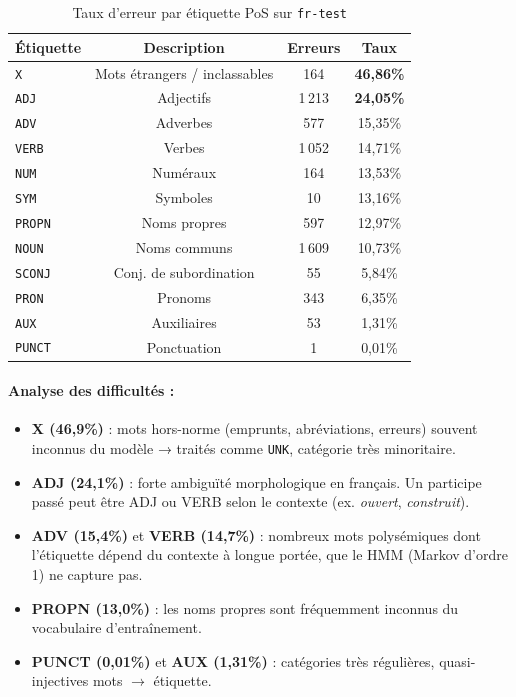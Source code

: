 \documentclass[12pt,a4paper]{article}
\begin{document}
\begin{table}[H]
\centering
\caption{Taux d'erreur par étiquette PoS sur \texttt{fr-test}}
\begin{tabular}{lccc}
\toprule
\textbf{Étiquette} & \textbf{Description} & \textbf{Erreurs} & \textbf{Taux} \\
\midrule
\texttt{X}     & Mots étrangers / inclassables & 164   & \textbf{46,86\%} \\
\texttt{ADJ}   & Adjectifs                     & 1\,213 & \textbf{24,05\%} \\
\texttt{ADV}   & Adverbes                      &   577  & 15,35\% \\
\texttt{VERB}  & Verbes                        & 1\,052 & 14,71\% \\
\texttt{NUM}   & Numéraux                      &   164  & 13,53\% \\
\texttt{SYM}   & Symboles                      &    10  & 13,16\% \\
\texttt{PROPN} & Noms propres                  &   597  & 12,97\% \\
\texttt{NOUN}  & Noms communs                  & 1\,609 & 10,73\% \\
\texttt{SCONJ} & Conj. de subordination        &    55  & 5,84\% \\
\texttt{PRON}  & Pronoms                       &   343  & 6,35\% \\
\texttt{AUX}   & Auxiliaires                   &    53  & 1,31\% \\
\texttt{PUNCT} & Ponctuation                   &     1  & 0,01\% \\
\bottomrule
\end{tabular}
\end{table}

\paragraph{Analyse des difficultés :}
\begin{itemize}
  \item \textbf{X (46,9\%)} : mots hors-norme (emprunts, abréviations, erreurs)
        souvent inconnus du modèle → traités comme \texttt{UNK}, catégorie très minoritaire.
  \item \textbf{ADJ (24,1\%)} : forte ambiguïté morphologique en français.
        Un participe passé peut être ADJ ou VERB selon le contexte
        (ex. \textit{ouvert}, \textit{construit}).
  \item \textbf{ADV (15,4\%)} et \textbf{VERB (14,7\%)} : nombreux mots
        polysémiques dont l'étiquette dépend du contexte à longue portée,
        que le HMM (Markov d'ordre 1) ne capture pas.
  \item \textbf{PROPN (13,0\%)} : les noms propres sont fréquemment inconnus
        du vocabulaire d'entraînement.
  \item \textbf{PUNCT (0,01\%)} et \textbf{AUX (1,31\%)} : catégories
        très régulières, quasi-injectives mots $\to$ étiquette.
\end{itemize}
\end{document}
